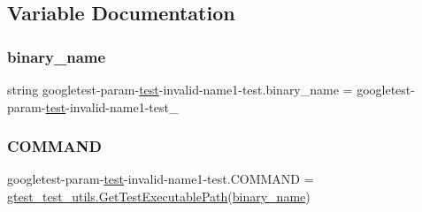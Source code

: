 \subsection{Variable Documentation}
\mbox{\label{namespacegoogletest-param-test-invalid-name1-test_a073018906c94da733e54cf4c457bec29}} 
\subsubsection{\texorpdfstring{binary\_name}{binary\_name}}
{\footnotesize\ttfamily string googletest-\/param-\/\mbox{\hyperlink{_mutual_8h_a707ee03719e99670bf6cfdfd897b8456}{test}}-\/invalid-\/name1-\/test.\+binary\+\_\+name = \textquotesingle{}googletest-\/param-\/\mbox{\hyperlink{_mutual_8h_a707ee03719e99670bf6cfdfd897b8456}{test}}-\/invalid-\/name1-\/test\+\_\+\textquotesingle{}}

\mbox{\label{namespacegoogletest-param-test-invalid-name1-test_a92131bc06f98ffc4aa4a6effd87da6fd}} 
\subsubsection{\texorpdfstring{COMMAND}{COMMAND}}
{\footnotesize\ttfamily googletest-\/param-\/\mbox{\hyperlink{_mutual_8h_a707ee03719e99670bf6cfdfd897b8456}{test}}-\/invalid-\/name1-\/test.\+C\+O\+M\+M\+A\+ND = \mbox{\hyperlink{namespacegtest__test__utils_a89ed3717984a80ffbb7a9c92f71b86a2}{gtest\+\_\+test\+\_\+utils.\+Get\+Test\+Executable\+Path}}(\mbox{\hyperlink{namespacegoogletest-param-test-invalid-name1-test_a073018906c94da733e54cf4c457bec29}{binary\+\_\+name}})}

